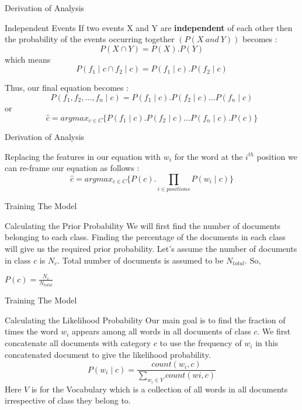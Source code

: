\documentclass[usenames,dvipsnames]{beamer}
\begin{document}
\begin{frame}{Derivation of Analysis}
	\begin{block}{Independent Events}
		If two events X and Y are \textbf{independent} of each other then the probability of the events occurring together $(P(X \ and \ Y))$ becomes $\colon$ 
		$$P(X \cap Y) = P(X).P(Y)$$
		which means
		$$P(f_{1} \mid c \cap f_{2} \mid c) = P(f_{1} \mid c).P(f_{2} \mid c)$$
	\end{block}
\begin{block}{}
	Thus, our final equation becomes $\colon$
	$$P(f_{1}, f_{2}, \dots, f_{n} \mid c) = P(f_{1} \mid c).P(f_{2} \mid c)\dots P(f_{n} \mid c)$$
	or 
	\begin{equation}
	\hat{c} = argmax_{c \in C} \{ P(f_{1} \mid c).P(f_{2} \mid c)\dots P(f_{n} \mid c).P(c) \}
	\end{equation}
\end{block}
\end{frame}
\begin{frame}{Derivation of Analysis}
	\begin{block}{}
	Replacing the features in our equation with $w_{i}$ for the word at the $i^{th}$ position we can re-frame our equation as follows $\colon$
	\begin{equation}
			\hat{c} = argmax_{c \in C} \{P(c).\prod _{i \in positions} P(w_{i} \mid c) \}
	\end{equation}
\end{block}
\end{frame}
\begin{frame}{Training The Model}
	\begin{block}{Calculating the Prior Probability}
		We will first find the number of documents belonging to each class. Finding the percentage of the documents in each class will give us the required prior probability.
		Let’s assume the number of documents in class $c$ is $N_{c}$.
		Total number of documents is assumed to be $N_{total}$. So, 
		\begin{center}
		$P(c) = \frac{N_{c}}{N_{total}}$
		\end{center}
	\end{block}
\end{frame}
\begin{frame}{Training The Model}
\begin{block}{Calculating the Likelihood Probability}
	Our main goal is to find the fraction of times the word $w_{i}$ appears among all words in all documents of class $c$. We first concatenate all documents with category $c$ to use the frequency of $w_{i}$ in this concatenated document to give the likelihood probability.
	$$P(w_{i} \mid c) = \frac{count(w_{i},c)}{\sum_{w_{i} \in V}count(wi, c)} $$
	Here $V$ is for the Vocabulary which is a collection of all words in all documents irrespective of class they belong to.
\end{block}
\end{frame}
\end{document}
